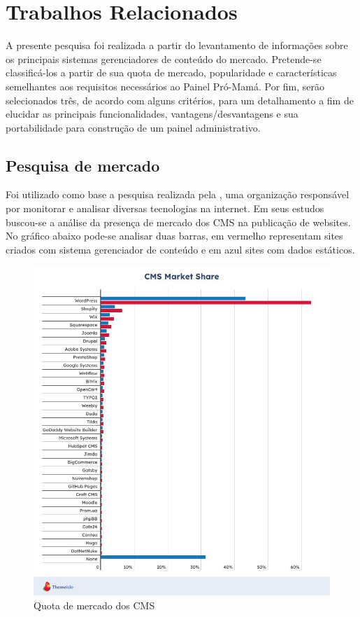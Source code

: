 \chapter{Trabalhos Relacionados}\label{cap_exemplos}

A presente pesquisa foi realizada a partir do levantamento de informações sobre os principais sistemas gerenciadores de conteúdo do mercado. Pretende-se classificá-los a partir de sua quota de mercado, popularidade e características semelhantes aos requisitos necessários ao Painel Pró-Mamá. Por fim, serão selecionados três, de acordo com alguns critérios, para um detalhamento a fim de elucidar as principais funcionalidades, vantagens/desvantagens e sua portabilidade para construção de um painel administrativo.

\section{Pesquisa de mercado}

Foi utilizado como base a pesquisa realizada pela , uma organização responsável por monitorar e analisar diversas tecnologias na internet. Em seus estudos buscou-se a análise da presença de mercado dos CMS na publicação de websites. No gráfico abaixo pode-se analisar duas barras, em vermelho representam sites criados com sistema gerenciador de conteúdo e em azul sites com dados estáticos.

\begin{figure}[htb]
  \caption{\label{fig_grafico} Quota de mercado dos CMS}
  \begin{center}
    \includegraphics[scale=0.45]{imagens/w3techs-cms.JPG}
  \end{center}
\end{figure}

